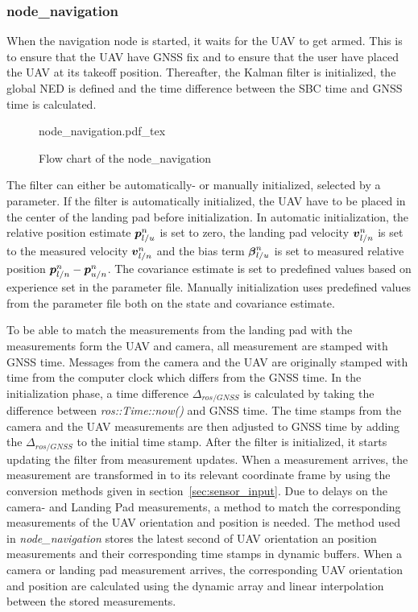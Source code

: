 \subsubsection{node\_navigation} %
\label{ssub:node_navigation}
When the navigation node is started, it waits for the UAV to get armed. This is to ensure that the UAV have GNSS fix and to ensure that the user have placed the UAV at its takeoff position. Thereafter, the Kalman filter is initialized, the global NED is defined and the time difference between the \gls{SBC} time and \gls{GNSS} time is calculated.
\begin{figure}[ht]
    \centering
    {node_navigation.pdf_tex}
    \caption{Flow chart of the node\_navigation}
    \label{fig:nodeNavigation}
\end{figure}
The filter can either be automatically- or manually initialized, selected by a parameter. If the filter is automatically initialized, the UAV have to be placed in the center of the landing pad before initialization. In automatic initialization, the relative position estimate $\boldsymbol{p}^{n}_{l/u}$ is set to zero, the landing pad velocity $\boldsymbol{v}^{n}_{l/n}$ is set to the measured velocity $\boldsymbol{v}^n_{l/n}$ and the bias term $\boldsymbol{\beta}_{l/u}^{n}$ is set to measured relative position $\boldsymbol{p}^n_{l/n}-\boldsymbol{p}^n_{u/n}$. The covariance estimate is set to predefined values based on experience set in the parameter file. Manually initialization uses predefined values from the parameter file both on the state and covariance estimate.

To be able to match the measurements from the landing pad with the measurements form the \gls{UAV} and camera, all measurement are stamped with \gls{GNSS} time. Messages from the camera and the \gls{UAV} are originally stamped with time from the computer clock which differs from the \gls{GNSS} time. In the initialization phase, a time difference $\Delta_{ros/GNSS}$ is calculated by taking the difference between \textit{ros::Time::now()} and \gls{GNSS} time. The time stamps from the camera and the \gls{UAV} measurements are then adjusted to \gls{GNSS} time by adding the $\Delta_{ros/GNSS}$ to the initial time stamp. After the filter is initialized, it starts updating the filter from measurement updates. When a measurement arrives, the measurement are transformed in to its relevant coordinate frame by using the conversion methods given in section~\ref{sec:sensor_input}. Due to delays on the camera- and Landing Pad measurements, a method to match the corresponding measurements of the \gls{UAV} orientation and position is needed. The method used in \textit{node\_navigation} stores the latest second of \gls{UAV} orientation an position measurements and their corresponding time stamps in dynamic buffers. When a camera or landing pad measurement arrives, the corresponding \gls{UAV} orientation and position are calculated using the dynamic array and linear interpolation between the stored measurements. 


